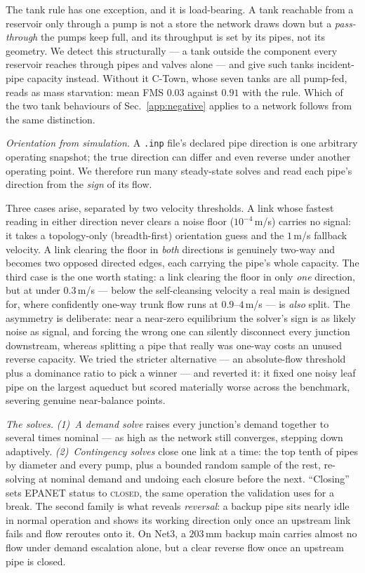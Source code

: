 \documentclass[11pt]{article}
\begin{document}
The tank rule has one exception, and it is load-bearing. A tank reachable from a
reservoir only through a pump is not a store the network draws down but a
\emph{pass-through} the pumps keep full, and its throughput is set by its pipes,
not its geometry. We detect this structurally --- a tank outside the component
every reservoir reaches through pipes and valves alone --- and give such tanks
incident-pipe capacity instead. Without it C-Town, whose seven tanks are all
pump-fed, reads as mass starvation: mean FMS $0.03$ against $0.91$ with the rule.
Which of the two tank behaviours of Sec.~\ref{app:negative} applies to a network
follows from the same distinction.

\emph{Orientation from simulation.} A \texttt{.inp} file's declared pipe
direction is one arbitrary operating snapshot; the true direction can differ and
even reverse under another operating point. We therefore run many steady-state solves
and read each pipe's direction from the \emph{sign} of its flow.

Three cases arise, separated by two velocity thresholds. A link whose fastest
reading in either direction never clears a noise floor ($10^{-4}$\,m/s) carries
no signal: it takes a topology-only (breadth-first) orientation guess and the
$1$\,m/s fallback velocity. A link clearing the floor in \emph{both} directions
is genuinely two-way and becomes two opposed directed edges, each carrying the
pipe's whole capacity. The third case is the one worth stating: a link
clearing the floor in only \emph{one} direction, but at under $0.3$\,m/s ---
below the self-cleansing velocity a real main is designed for, where confidently
one-way trunk flow runs at $0.9$--$4$\,m/s --- is \emph{also} split. The
asymmetry is deliberate: near a near-zero equilibrium the solver's sign is as
likely noise as signal, and forcing the wrong one can silently disconnect every
junction downstream, whereas splitting a pipe that really was one-way costs an
unused reverse capacity. We tried the stricter alternative --- an absolute-flow
threshold plus a dominance ratio to pick a winner --- and reverted it: it fixed
one noisy leaf pipe on the largest aqueduct but scored materially worse across
the benchmark, severing genuine near-balance points.

\emph{The solves.} \emph{(1)~A demand solve} raises every junction's demand
together to several times nominal --- as high as the network still converges,
stepping down adaptively. \emph{(2)~Contingency solves} close one link at a
time: the top tenth of pipes by diameter and every pump, plus a bounded random
sample of the rest, re-solving at nominal demand and undoing each closure before
the next. ``Closing'' sets EPANET status to \textsc{closed}, the same operation
the validation uses for a break. The second family is what reveals
\emph{reversal}: a backup pipe sits nearly idle in normal operation and shows its
working direction only once an upstream link fails and flow reroutes onto it. On
Net3, a $203$\,mm backup main carries almost no flow under demand escalation
alone, but a clear reverse flow once an upstream pipe is closed.
\end{document}
